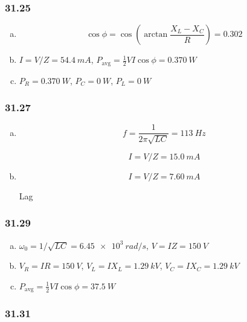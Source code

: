 \documentclass{article}
\begin{document}
\subsubsection{31.25}

\begin{enumerate}[(a)]
  \item \[\cos \phi = \cos \left( \arctan \frac{X_L - X_C}{R} \right) = 0.302\]

  \item $I = V / Z = \qty{54.4}{mA}$, $P_\text{avg} = \frac{1}{2} V I \cos \phi = \qty{0.370}{W}$

  \item $P_R = \qty{0.370}{W}$, $P_C = \qty{0}{W}$, $P_L = \qty{0}{W}$
\end{enumerate}

\subsubsection{31.27}

\begin{enumerate}[(a)]
  \item

        \[f = \frac{1}{2 \pi \sqrt{L C}} = \qty{113}{Hz}\]

        \[I = V / Z = \qty{15.0}{mA}\]

  \item

        \[I = V / Z = \qty{7.60}{mA}\]

        Lag
\end{enumerate}

\subsubsection{31.29}

\begin{enumerate}[(a)]
  \item $\omega_0 = 1 / \sqrt{L C} = \qty{6.45e3}{rad/s}$, $V = I Z = \qty{150}{V}$

  \item $V_R = I R = \qty{150}{V}$, $V_L = I X_L = \qty{1.29}{kV}$, $V_C = I X_C = \qty{1.29}{kV}$

  \item $P_\text{avg} = \frac{1}{2} V I \cos \phi = \qty{37.5}{W}$
\end{enumerate}

\subsubsection{31.31}
\end{document}
